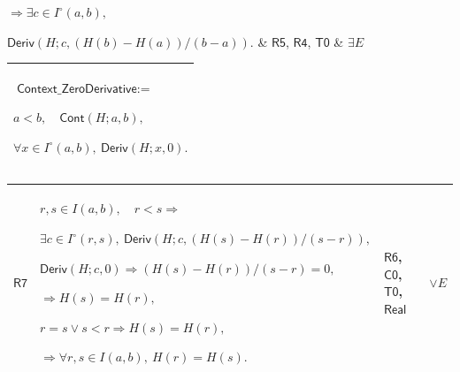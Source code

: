 \documentclass[11pt]{amsart}
\newlength{\FTCOneColumnBody}
\newlength{\FTCFourColumnBody}
\begin{document}
{\begin{tabular}
$\displaystyle \Rightarrow\exists c\in I^\circ(a,b),$\par
$\displaystyle \textsf{Deriv}(H;c,(H(b)-H(a))/(b-a)).$ & \hyperlink{proof:R5}{$\displaystyle \textsf{R5}$}, \hyperlink{proof:R4}{$\displaystyle \textsf{R4}$}, \hyperlink{proof:T0}{$\displaystyle \textsf{T0}$} & $\displaystyle \exists E$\\ \hline
\end{tabular}%
\par\setlength{\parskip}{0pt}\nointerlineskip
\noindent
\begin{tabular}{|@{}>{\centering\arraybackslash}m{\FTCOneColumnBody}|}\hline
$\displaystyle \textsf{Context\_ZeroDerivative}:=$\par
$\displaystyle a<b,\quad\textsf{Cont}(H;a,b),$\par
$\displaystyle \forall x\in I^\circ(a,b),\ \textsf{Deriv}(H;x,0).$\\ \hline
\end{tabular}%
\par\setlength{\parskip}{0pt}\nointerlineskip
\noindent
\begin{tabular}{|@{}>{\centering\arraybackslash}m{0.078431\FTCFourColumnBody}|>{\centering\arraybackslash}m{0.535947\FTCFourColumnBody}|>{\centering\arraybackslash}m{0.281045\FTCFourColumnBody}|>{\centering\arraybackslash}m{0.104575\FTCFourColumnBody}|}\hline
\hypertarget{proof:R7}{$\displaystyle \textsf{R7}$} & $\displaystyle r,s\in I(a,b),\quad r<s\Rightarrow$\par
$\displaystyle \exists c\in I^\circ(r,s),\ \textsf{Deriv}(H;c,(H(s)-H(r))/(s-r)),$\par
$\displaystyle \textsf{Deriv}(H;c,0)\Rightarrow(H(s)-H(r))/(s-r)=0,$\par
$\displaystyle \Rightarrow H(s)=H(r),$\par
$\displaystyle r=s\lor s<r\Rightarrow H(s)=H(r),$\par
$\displaystyle \Rightarrow\forall r,s\in I(a,b),\ H(r)=H(s).$ & \hyperlink{proof:R6}{$\displaystyle \textsf{R6}$}, \hyperlink{proof:C0}{$\displaystyle \textsf{C0}$}, \hyperlink{proof:T0}{$\displaystyle \textsf{T0}$}, \hyperlink{ax:Real}{$\displaystyle \textsf{Real}$} & $\displaystyle \lor E$\\ \hline
\end{tabular}%
\par
}
\end{document}
